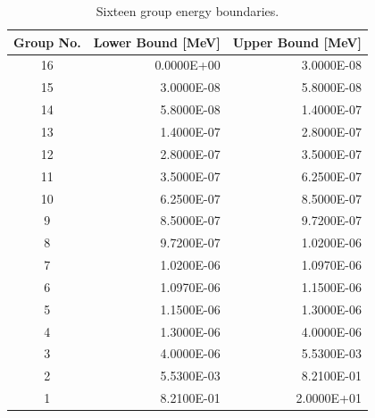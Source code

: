 \begin{appendices}
\begin{table}[h!]
  \centering
  \footnotesize
  \caption{Sixteen group energy boundaries.}
  \label{table:app-16-groups} 
  \vspace{14pt}
  \begin{tabular}{c r r}
    \toprule
    {\bf Group No.} &
    {\bf Lower Bound [MeV]} &
    {\bf Upper Bound [MeV]} \\
    \midrule
16 & 0.0000E+00 & 3.0000E-08 \\
15 & 3.0000E-08 & 5.8000E-08 \\
14 & 5.8000E-08 & 1.4000E-07 \\
13 & 1.4000E-07 & 2.8000E-07 \\
12 & 2.8000E-07 & 3.5000E-07 \\
11 & 3.5000E-07 & 6.2500E-07 \\
10 & 6.2500E-07 & 8.5000E-07 \\
9 & 8.5000E-07 & 9.7200E-07 \\
8 & 9.7200E-07 & 1.0200E-06 \\
7 & 1.0200E-06 & 1.0970E-06 \\
6 & 1.0970E-06 & 1.1500E-06 \\
5 & 1.1500E-06 & 1.3000E-06 \\
4 & 1.3000E-06 & 4.0000E-06 \\
3 & 4.0000E-06 & 5.5300E-03 \\
2 & 5.5300E-03 & 8.2100E-01 \\
1 & 8.2100E-01 & 2.0000E+01 \\
  \bottomrule
 \end{tabular}
\end{table}


\end{appendices}
